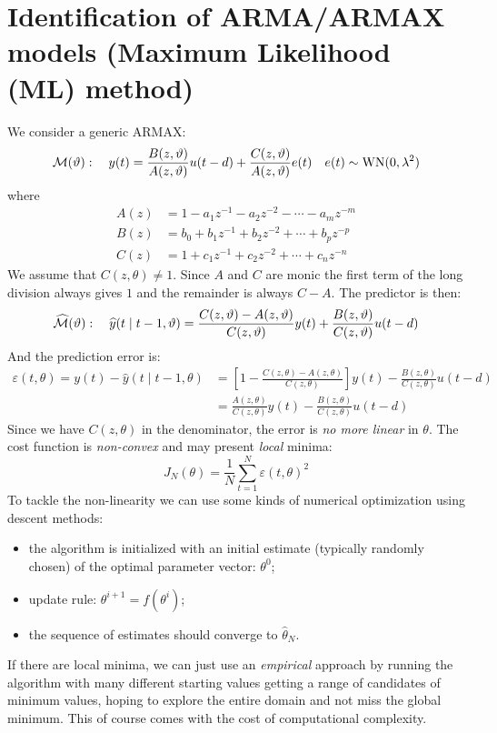 
\section{Identification of ARMA/ARMAX models (Maximum Likelihood (ML) method)}

We consider a generic ARMAX:
\[
	\mathcal{M}(\vartheta ): \quad y(t)=\frac{B(z,\vartheta )}{A(z,\vartheta)} u(t-d)+\frac{C(z,\vartheta )}{A(z,\vartheta)}e(t)\quad e(t)\sim \operatorname{WN}(0,\lambda^2)
\]
where
\begin{align*}
	A(z)&=1-a_{1} z^{-1}-a_{2} z^{-2}-\cdots-a_{m} z^{-m} \\
	B(z)&=b_{0}+b_{1} z^{-1}+b_{2} z^{-2}+\cdots+b_{p} z^{-p} \\
	C(z)&=1+c_{1} z^{-1}+c_{2} z^{-2}+\cdots+c_{n} z^{-n}
\end{align*}
We assume that $C(z,\theta)\neq 1$. Since $A$ and $C$ are monic the first term of the long division always gives $1$ and the remainder is always $C-A$. The predictor is then:
\[
	\widehat{\mathcal{M}}(\vartheta): \quad \widehat{y}(t \mid t-1, \vartheta)=\frac{C(z,\vartheta)-A(z,\vartheta)}{C(z,\vartheta)} y(t)+\frac{B(z,\vartheta)}{C(z,\vartheta)} u(t-d)
\]
And the prediction error is:
\begin{align*}
	\varepsilon(t, \theta)=y(t)-\hat{y}(t \mid t-1, \theta)&=\left[1-\frac{C(z,\theta)-A(z,\theta)}{C(z,\theta)}\right] y(t)-\frac{B(z,\theta)}{C(z,\theta)} u(t-d)\\
	&=\frac{A(z,\theta)}{C(z,\theta)} y(t)-\frac{B(z,\theta)}{C(z,\theta)} u(t-d)
\end{align*}
Since we have $C(z,\theta)$ in the denominator, the error is \emph{no more linear} in $\theta$.
The cost function is \emph{non-convex} and may present \emph{local} minima:
\[
	J_{N}(\theta)=\frac{1}{N} \sum_{t=1}^{N} \varepsilon(t, \theta)^{2}
\]
To tackle the non-linearity we can use some kinds of numerical optimization using descent methods:
\begin{itemize}
	\item the algorithm is initialized with an initial estimate (typically randomly chosen) of the optimal parameter vector: $\theta^{0}$;
	\item update rule: $\theta^{i+1} = f (\theta^{i})$;
	\item the sequence of estimates should converge to $\hat\theta_{N}$.
\end{itemize}
If there are local minima, we can just use an \emph{empirical} approach by running the algorithm with many different starting values getting a range of candidates of minimum values, hoping to explore the entire domain and not miss the global minimum. This of course comes with the cost of computational complexity.


